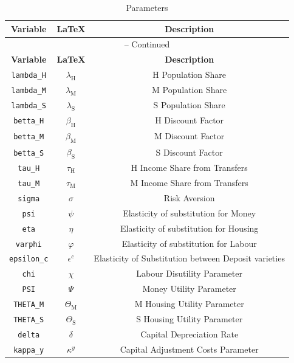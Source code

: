 \begin{center}
\begin{longtable}{ccc}
\caption{Parameters}\\%
\hline%
\multicolumn{1}{c}{\textbf{Variable}} &
\multicolumn{1}{c}{\textbf{\LaTeX}} &
\multicolumn{1}{c}{\textbf{Description}}\\%
\hline\hline%
\endfirsthead
\multicolumn{3}{c}{{\tablename} \thetable{} -- Continued}\\%
\hline%
\multicolumn{1}{c}{\textbf{Variable}} &
\multicolumn{1}{c}{\textbf{\LaTeX}} &
\multicolumn{1}{c}{\textbf{Description}}\\%
\hline\hline%
\endhead
\texttt{lambda\_H} & $\lambda_\mathrm{H}$ & H Population Share\\
\texttt{lambda\_M} & $\lambda_\mathrm{M}$ & M Population Share\\
\texttt{lambda\_S} & $\lambda_\mathrm{S}$ & S Population Share\\
\texttt{betta\_H} & $\beta_\mathrm{H}$ & H Discount Factor\\
\texttt{betta\_M} & $\beta_\mathrm{M}$ & M Discount Factor\\
\texttt{betta\_S} & $\beta_\mathrm{S}$ & S Discount Factor\\
\texttt{tau\_H} & $\tau_\mathrm{H}$ & H Income Share from Transfers\\
\texttt{tau\_M} & $\tau_\mathrm{M}$ & M Income Share from Transfers\\
\texttt{sigma} & $\sigma$ & Risk Aversion\\
\texttt{psi} & $\psi$ & Elasticity of substitution for Money\\
\texttt{eta} & $\eta$ & Elasticity of substitution for Housing\\
\texttt{varphi} & $\varphi$ & Elasticity of substitution for Labour\\
\texttt{epsilon\_c} & $\epsilon^c$ & Elasticity of Substitution between Deposit varieties\\
\texttt{chi} & $\chi$ & Labour Disutility Parameter\\
\texttt{PSI} & $\Psi$ & Money Utility Parameter\\
\texttt{THETA\_M} & $\Theta_\mathrm{M}$ & M Housing Utility Parameter\\
\texttt{THETA\_S} & $\Theta_\mathrm{S}$ & S Housing Utility Parameter\\
\texttt{delta} & $\delta$ & Capital Depreciation Rate\\
\texttt{kappa\_y} & $\kappa^y$ & Capital Adjustment Costs Parameter\\

\end{longtable}
\end{center}
